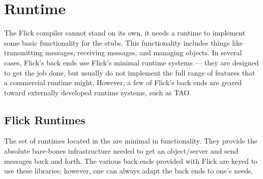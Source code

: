 

\chapter{Runtime}
\label{cha:Runtime}

The Flick compiler cannot stand on its own, it needs a runtime to implement
some basic functionality for the stubs.  This functionality includes things
like transmitting messages, receiving messages, and managing objects.  In
several cases, Flick's back ends use Flick's minimal runtime systems --- they
are designed to get the job done, but usually do not implement the full range
of features that a commercial runtime might.  However, a few of Flick's back
ends are geared toward externally developed runtime systems, such as TAO.



\section{Flick Runtimes}
\label{sec:Runtime:Flick Runtimes}

The set of runtimes located in the  are
minimal in functionality.  They provide the absolute bare-bones infrastructure
needed to get an object/server and send messages back and forth.  The various
back ends provided with Flick are keyed to use these libraries; however, one
can always adapt the back ends to one's needs.

